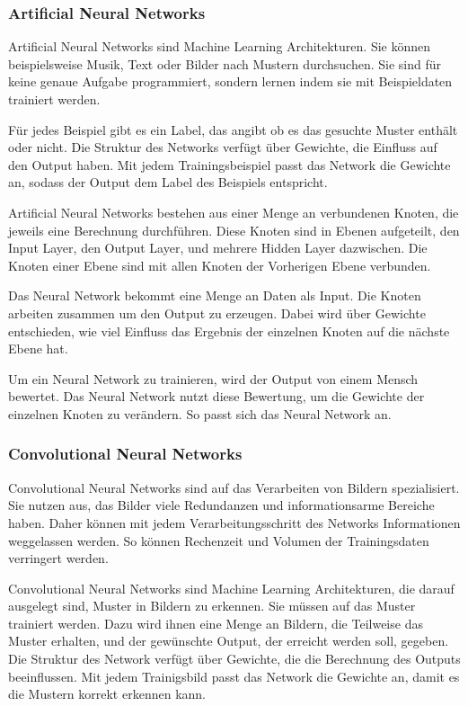 \subsubsection{Artificial Neural Networks}
Artificial Neural Networks sind Machine Learning Architekturen. Sie können beispielsweise Musik, Text oder Bilder nach Mustern durchsuchen. Sie sind für keine genaue Aufgabe programmiert, sondern lernen indem sie mit Beispieldaten trainiert werden. 

Für jedes Beispiel gibt es ein Label, das angibt ob es das gesuchte Muster enthält oder nicht. Die Struktur des Networks verfügt über Gewichte, die Einfluss auf den Output haben. Mit jedem Trainingsbeispiel passt das Network die Gewichte an, sodass der Output dem Label des Beispiels entspricht.\citep{introToCNN,surveyOfDeepLearing}

Artificial Neural Networks bestehen aus einer Menge an verbundenen Knoten, die jeweils eine Berechnung durchführen. Diese Knoten sind in Ebenen aufgeteilt, den Input Layer, den Output Layer, und mehrere Hidden Layer dazwischen. Die Knoten einer Ebene sind mit allen Knoten der Vorherigen Ebene verbunden.\citep{introToCNN,surveyOfDeepLearing}

Das Neural Network bekommt eine Menge an Daten als Input. Die Knoten arbeiten zusammen um den Output zu erzeugen. Dabei wird über Gewichte entschieden, wie viel Einfluss das Ergebnis der einzelnen Knoten auf die nächste Ebene hat.\citep{introToCNN,surveyOfDeepLearing}

Um ein Neural Network zu trainieren, wird der Output von einem Mensch bewertet. Das Neural Network nutzt diese Bewertung, um die Gewichte der einzelnen Knoten zu verändern. So passt sich das Neural Network an. \citep{introToCNN,surveyOfDeepLearing}

\subsubsection{Convolutional Neural Networks}
Convolutional Neural Networks sind auf das Verarbeiten von Bildern spezialisiert. Sie nutzen aus, das Bilder viele Redundanzen und informationsarme Bereiche haben. Daher können mit jedem Verarbeitungsschritt des Networks Informationen weggelassen werden. So können Rechenzeit und Volumen der Trainingsdaten verringert werden.\citep{introToCNN,surveyOfDeepLearing,cNNforClass}

Convolutional Neural Networks sind Machine Learning Architekturen, die darauf ausgelegt sind, Muster in Bildern zu erkennen. Sie müssen auf das Muster trainiert werden. Dazu wird ihnen eine Menge an Bildern, die Teilweise das Muster erhalten, und der gewünschte Output, der erreicht werden soll, gegeben. Die Struktur des Network verfügt über Gewichte, die die Berechnung des Outputs beeinflussen. Mit jedem Trainigsbild passt das Network die Gewichte an, damit es die Mustern korrekt erkennen kann.\citep{introToCNN,surveyOfDeepLearing}

